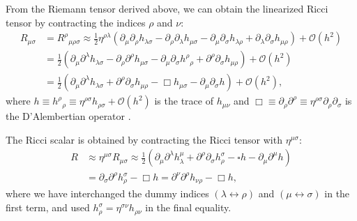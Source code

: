 From the Riemann tensor derived above, we can obtain the linearized Ricci tensor by contracting the indices $\rho$ and $\nu$:
\begin{equation}
\begin{aligned}
R_{\mu \sigma} &= R^{\rho}{}_{\mu \rho \sigma} \approx \frac{1}{2}\eta^{\rho\lambda}(\partial_\mu \partial_\rho h_{\lambda \sigma}
- \partial_\rho \partial_\lambda h_{\mu \sigma}
- \partial_\mu \partial_\sigma h_{\lambda \rho}
+ \partial_\lambda \partial_\sigma h_{\mu \rho})+ \mathcal{O}(h^2) \\
&= \frac{1}{2} \left(\partial_\mu \partial^{\lambda} h_{\lambda \sigma}
- \partial_{\rho} \partial^{\rho} h_{\mu \sigma} 
- \partial_{\mu} \partial_{\sigma} h^{\rho}{}_{\rho}
+ \partial^{\rho} \partial_{\sigma} h_{\mu \rho} \right)+ \mathcal{O}(h^2) \\
&= \frac{1}{2} \left(\partial_\mu \partial^{\lambda} h_{\lambda \sigma} + \partial^{\rho} \partial_{\sigma} h_{\mu \rho}
- \Box h_{\mu \sigma} 
- \partial_{\mu} \partial_{\sigma} h \right)+ \mathcal{O}(h^2),
\label{linearizedriemann}
\end{aligned}
\end{equation}
where $h\equiv h^{\rho}{}_{\rho}\equiv\eta^{\rho\sigma} h_{\rho\sigma}+\mathcal{O}(h^2)$ is the trace of $h_{\mu\nu}$ and $\Box \equiv \partial_{\rho} \partial^{\rho} \equiv \eta^{\rho\sigma} \partial_{\rho} \partial_{\sigma}$ is the D’Alembertian operator \cite{Llibre_Peter_Collier_unacosadificildecomprender}.  

The Ricci scalar is obtained by contracting the Ricci tensor with $\eta^{\mu\sigma}$: 
\begin{equation}
\begin{aligned}
R &\approx \eta^{\mu\sigma} R_{\mu\sigma} \approx \frac{1}{2} \left(\partial_\mu \partial^{\lambda} h_{\lambda}^{\mu} + \partial^{\rho} \partial_{\sigma} h_{\rho}^{\sigma} - \square h 
- \partial_\mu \partial^{\mu} h 
\right) \\
&= \partial_{\sigma} \partial^{\rho} h^{\sigma}_{\rho} - \Box h = \partial^{\nu} \partial^{\rho} h_{\nu\rho} - \Box h ,
\label{lienarizedricci}
\end{aligned}
\end{equation}
where we have interchanged the dummy indices $(\lambda \leftrightarrow \rho)$ and $(\mu \leftrightarrow \sigma)$ in the first term, and used $h^{\sigma}_{\rho}=\eta^{\sigma \nu}h_{\rho \nu}$ in the final equality.

